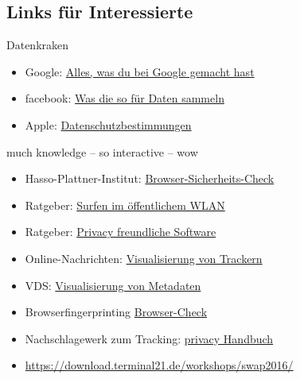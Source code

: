 \documentclass[hyperref={colorlinks,linkcolor=white}, utf8]{beamer}
\begin{document}
	\subsection{Links für Interessierte}
	\begin{frame}{Datenkraken}
			\noindent
			\begin{itemize}
				\item Google: \href{https://myactivity.google.com/}{Alles, was du bei Google gemacht hast}
				\item facebook: \href{https://netzpolitik.org/2016/98-daten-die-facebook-ueber-dich-weiss-und-nutzt-um-werbung-auf-dich-zuzuschneiden/}{Was die so für Daten sammeln}
				\item Apple: \href{https://www.apple.com/privacy/privacy-policy/}{Datenschutzbestimmungen}
			\end{itemize}
	\end{frame}
	
		\begin{frame}{much knowledge -- so interactive -- wow}
			\noindent
			\begin{itemize}
				\item Hasso-Plattner-Institut: \href{https://sec.hpi.de/vulndb/sd_first/}{Browser-Sicherheits-Check}
				\item Ratgeber: 
				\href{https://www.mbem.nrw/unterwegs-im-oeffentlichen-wlan-aber-gut-geschuetzt}{Surfen im öffentlichem WLAN }
				\item Ratgeber: \href{https://prism-break.org/en/}{Privacy freundliche Software}
				\item Online-Nachrichten: \href{https://trackography.org/}{Visualisierung von Trackern}
				\item VDS: \href{http://www.zeit.de/datenschutz/malte-spitz-vorratsdaten }{Visualisierung von Metadaten}				
				\item Browserfingerprinting \href{https://panopticlick.eff.org}{Browser-Check}
				\item Nachschlagewerk zum Tracking: \href{https://privacy-handbuch.de/}{privacy Handbuch}
				\item \url{https://download.terminal21.de/workshops/swap2016/}
			\end{itemize}
		\end{frame}
	
	
	
\end{document}
